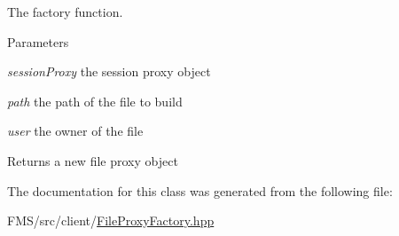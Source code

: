 The factory function. 


\begin{DoxyParams}{Parameters}
\item[{\em sessionProxy}]the session proxy object \item[{\em path}]the path of the file to build \item[{\em user}]the owner of the file \end{DoxyParams}
\begin{DoxyReturn}{Returns}
a new file proxy object 
\end{DoxyReturn}


The documentation for this class was generated from the following file:\begin{DoxyCompactItemize}
\item 
FMS/src/client/\hyperlink{FileProxyFactory_8hpp}{FileProxyFactory.hpp}\end{DoxyCompactItemize}
